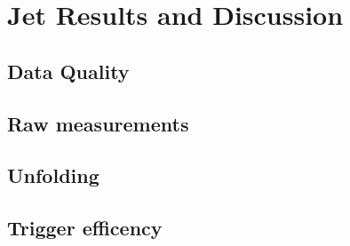\chapter{Jet Results and Discussion} \label{ch:analysis}

\section{Data Quality}

\section{Raw measurements}

\section{Unfolding}

\section{Trigger efficency}\label{sec:trigeff}
